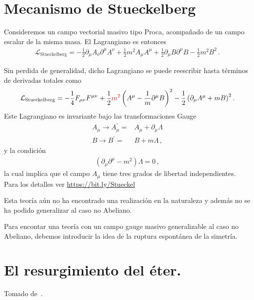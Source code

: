 \section{Mecanismo de Stueckelberg}
\begin{frame}
Consideremos un campo vectorial masivo tipo Proca, acompañado de un campo escalar de la misma masa. El Lagrangiano es entonces~\cite{Ruegg:2003ps}
\begin{align}
\mathcal{L}_{\text{Stueckelberg}}  =-\frac{1}{2} \partial_{\mu} A_{\nu} \partial^{\mu} A^{\nu}+\frac{1}{2} m^{2} A_\mu A^\mu+\frac{1}{2} \partial_{\mu} B \partial^{\mu} B-\frac{1}{2} m^{2} B^{2}\,.
\end{align}

Sin perdida de generalidad, dicho Lagrangiano se puede reescribir hasta términos de derivadas totales como
\begin{align}
  \mathcal{L}_{\text{Stueckelberg}}=-\frac{1}{4} F_{\mu \nu} F^{\mu \nu}+\frac{1}{2} {\color{red}m^{2}}\left(A^{\mu}-\frac{1}{m} \partial^{\mu}B\right)^{2}-\frac{1}{2}\left(\partial_{\mu} A^\mu+m B\right)^{2}.
\end{align}
Este Lagrangiano es invariante bajo las transformaciones Gauge
\begin{align}
  A_{\mu} \rightarrow A_{\mu}^{\prime}=&A_{\mu}+\partial_{\mu} \Lambda \nonumber\\ 
B \rightarrow B^{\prime}=&B+m \Lambda\,,
\end{align}
y la condición
\begin{align}
  \left( \partial_\mu\partial^\mu-m^2   \right)\Lambda=0\,,
\end{align}
la cual implica que el campo $A_\mu$ tiene tres grados de libertad independientes. Para los detalles ver \url{https://bit.ly/Stueckel}

Esta teoría aún no ha encontrado una realización en la naturaleza y además no se ha podido generalizar al caso no Abeliano.

Para encontar una teoría con un campo gauge masivo generalizable al caso no Abeliano, debemos introducir la idea de la ruptura espontánea de la simetría.

\end{frame}
\section{El resurgimiento del éter.}

Tomado de~\cite{restrepo2013resurgimiento}.

